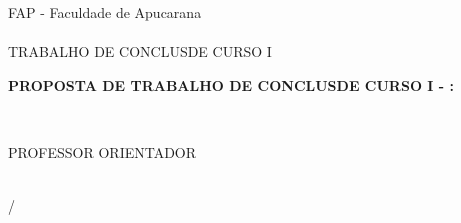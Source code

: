 
\begin{titlepage}
\label{pro:capa}
  \begin{center}
    FAP - Faculdade de Apucarana\\
    \Curso\\
    TRABALHO DE CONCLUS\AO DE CURSO I\\
    \vfill
    
    \textbf{PROPOSTA DE TRABALHO DE CONCLUS\AO DE CURSO I - \NOME: \ASSUNTO}\\
    \vfill

    \AUTOR\\
    \vfill

    PROFESSOR ORIENTADOR\\
    \ORIENTADOR\\
    \vfill

    \begin{espacosimples}
      {\LOCAL}/{\DATA}
    \end{espacosimples}
  \end{center}
\end{titlepage}
